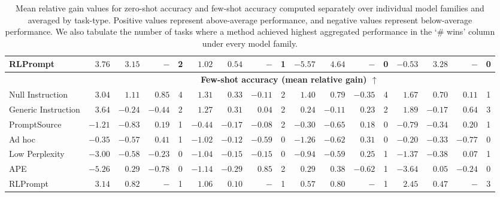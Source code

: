 \begin{table*}[t]
{\begin{tabular}{lrrrcrrrcrrrcrrrc}
RLPrompt            & $3.76$ & $3.15$ & $-$ & 2                             & $1.02$ & $0.54$ & $-$ & 1 &                          $-5.57$ & $4.64$ & $-$ & 0 &                             $-0.53$ & $3.28$ & $-$ & 0\\
\midrule
\rowcolor{gray!20} & \multicolumn{16}{c}{\bf{Few-shot accuracy (mean relative gain) $\uparrow$}} \\ 
\midrule
Null Instruction    &  $3.04$ &  $\mathbf{1.11}$ &  $\mathbf{0.85}$ &  4 &                     $\mathbf{1.31}$ &  $\mathbf{0.33}$ & $-0.11$ & 2 &                  $\mathbf{1.40}$ &  $0.79$ & $-0.35$ & 4 &                       $1.67$ &  $\mathbf{0.70}$ &  $0.11$ & 1\\
Generic Instruction &  $\mathbf{3.64}$ & $-0.24$ & $-0.44$ & 2 &                           $1.27$ &  $0.31$ &  $0.04$ & 2 &                                   $0.24$ & $-0.11$ &  $0.23$ & 2                                     &  $1.89$ & $-0.17$ &  $\mathbf{0.64}$ & 3\\
\greyrule
PromptSource        & $-1.21$ & $-0.83$ &  $0.19$ & 1                                          & $-0.44$ & $-0.17$ & $-0.08$ & 2                                    & $-0.30$ & $-0.65$ &  $0.18$ & 0                                       & $-0.79$ & $-0.34$ &  $0.20$ & 1\\
Ad hoc              & $-0.35$ & $-0.57$ &  $0.41$ & 1                                        & $-1.02$ & $-0.12$ & $-0.59$ & 0 &                                $-1.26$ & $-0.62$ &  $\mathbf{0.31}$ & 0                                  & $-0.20$ & $-0.33$ & $-0.77$ & 0\\
\greyrule
Low Perplexity      & $-3.00$ & $-0.58$ & $-0.23$ & 0                                           & $-1.04$ & $-0.15$ & $-0.15$ & 0                                  & $-0.94$ & $-0.59$ &  $0.25$ & 1                                      & $-1.37$ & $-0.38$ &  $0.07$ & 1\\
APE                 & $-5.26$ &  $0.29$ & $-0.78$ & 0                                          & $-1.14$ & $-0.29$ &  $\mathbf{0.85}$ & 2                          &  $0.29$ &  $0.38$ & $-0.62$ & 1                                              & $-3.64$ &  $0.05$ & $-0.24$ & 0\\
RLPrompt            &  $3.14$ &  $0.82$ &     $-$ & 1                                          &  $1.06$ &  $0.10$ &     $-$ & 1                                 & $0.57$ &  $\mathbf{0.80}$ &     $-$ & 1                             &  $\mathbf{2.45}$ &  $0.47$ &     $-$ & 3\\
\bottomrule
\end{tabular}}
\caption{Mean relative gain values for zero-shot accuracy and few-shot accuracy computed separately over individual model families and averaged by task-type. Positive values represent above-average performance, and negative values represent below-average performance. We also tabulate the number of tasks where a method achieved highest aggregated performance in the `\# wins' column under every model family.}
\label{table:accuracy_family_separated}
\end{table*}
